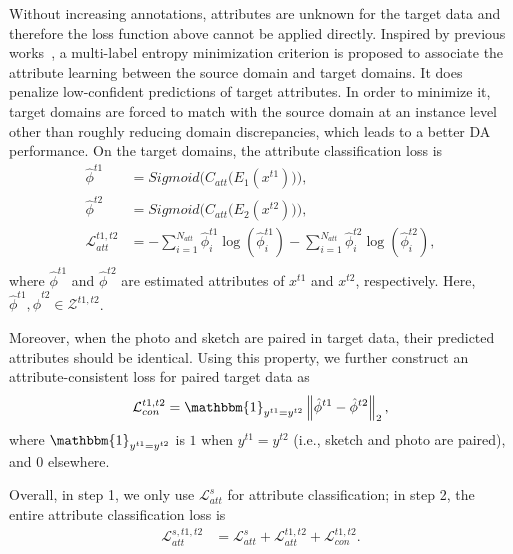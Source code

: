 \documentclass[journal]{IEEEtran}
\begin{document}
Without increasing annotations, attributes are unknown for the target data and therefore the loss function above cannot be applied directly. Inspired by previous works~\cite{luo2017label,shu2019transferable,zou2019consensus, saito2019semi}, a multi-label entropy minimization criterion is proposed to associate the attribute learning between the source domain and target domains. It does penalize low-confident predictions of target attributes. In order to minimize it, target domains are forced to match with the source domain at an instance level other than roughly reducing domain discrepancies, which leads to a better DA performance. On the target domains, the attribute classification loss is  
\begin{equation}
\begin{split}
\hat{\phi}^{t1} &=  Sigmoid \bigg(  C_{att} \big(E_{1}(x^{t1}) \big) \bigg), \\
\hat{\phi}^{t2} &=  Sigmoid \bigg(  C_{att} \big(E_{2}(x^{t2}) \big) \bigg), \\
\mathcal{L}_{att}^{t1,t2} &=  -\sum_{i = 1}^{N_{att}} \hat{\phi}^{t1}_{i} \log(\hat{\phi}^{t1}_{i}) -\sum_{i = 1}^{N_{att}} \hat{\phi}^{t2}_{i} \log(\hat{\phi}^{t2}_{i}), \\
\end{split}
\end{equation}
where $\hat{\phi}^{t1}$ and $\hat{\phi}^{t2}$ are estimated attributes of $x^{t1}$ and $x^{t2}$, respectively. Here, $\hat{\phi}^{t1},\hat{\phi}^{t2} \in \mathcal{Z}^{t1,t2}$.


Moreover, when the photo and sketch are paired in target data, their predicted attributes should be identical. Using this property, we further construct an attribute-consistent loss for paired target data as
\begin{equation}
\begin{split}
\mathcal{L}_{con}^{t1,t2} &=  \mathbbm{1}_{y^{t1}=y^{t2}} \left \| \hat{\phi}^{t1}- \hat{\phi}^{t2}\right \|_{2}, \\
\end{split}
\end{equation}
where $\mathbbm{1}_{y^{t1}=y^{t2}}$ is $1$ when $y^{t1}=y^{t2}$ (i.e., sketch and photo are paired), and $0$ elsewhere.
 
Overall, in step 1, we only use $\mathcal{L}_{att}^{s}$ for attribute classification; in step 2, the entire attribute classification loss is
\begin{equation}
\begin{split}
\mathcal{L}_{att}^{s,t1,t2} & = \mathcal{L}_{att}^{s} + \mathcal{L}_{att}^{t1,t2} + \mathcal{L}_{con}^{t1,t2} .
\end{split}
\end{equation}
\end{document}
